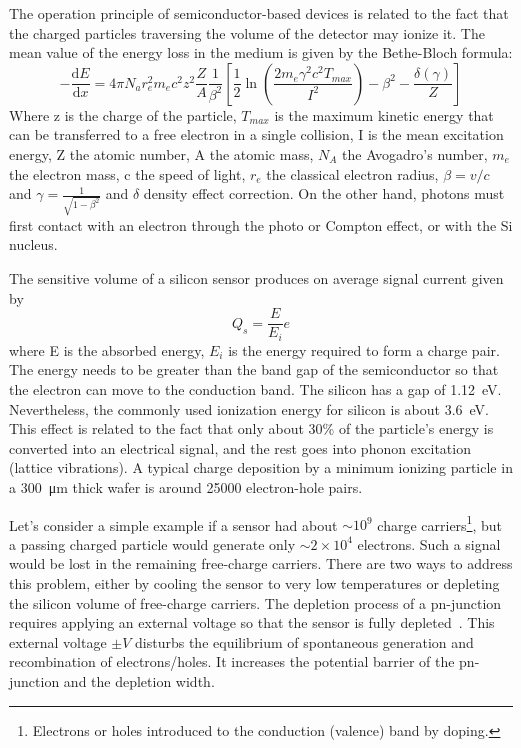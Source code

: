 The operation principle of semiconductor-based devices is related to the fact that the charged particles traversing the volume of the detector may ionize it. The mean value of the energy loss in the medium is given by the Bethe-Bloch formula:
\begin{equation}
-\dfrac{\mathrm dE}{\mathrm dx} = 4 \pi N_{a} r_{e}^{2} m_{e} c^{2} z^{2}  \dfrac{Z}{A} \frac{1}{\beta^{2}} \left[ \frac{1}{2}\ln(\frac{2m_{e}\gamma^{2}c^{2} T_{max}}{I^{2}}) - \beta^{2} -  \frac{\delta(\gamma)}{Z}\right]
\end{equation}
Where z is the charge of the particle, $T_{max}$ is the maximum kinetic energy that can be transferred to a free electron in a single collision, I is the mean excitation energy, Z the atomic number, A the atomic mass, $N_{A}$ the Avogadro’s number, $m_{e}$ the electron mass, c the speed of light, $r_{e}$ the classical electron radius, $\beta = v/c$ and $\gamma = \frac{1}{\sqrt{1-\beta^{2}}}$ and $\delta$ density effect correction. On the other hand, photons must first contact with an electron through the photo or Compton effect, or with the Si nucleus. 

The sensitive volume of a silicon sensor produces on average signal current given by 
\begin{equation}
    Q_{s} = \frac{E}{E_{i}}e
\end{equation}
where E is the absorbed energy, $E_{i}$ is the energy required to form a charge pair. The energy needs to be greater than the band gap of the semiconductor so that the electron can move to the conduction band. The silicon has a gap of \SI{1.12}{\eV}. Nevertheless, the commonly used ionization energy for silicon is about \SI{3.6}{\eV}. This effect is related to the fact that only about 30\% of the particle's energy is converted into an electrical signal, and the rest goes into phonon excitation (lattice vibrations). A typical charge deposition by a minimum ionizing particle in a \SI{300}{\micro\metre} thick wafer is around 25000 electron-hole pairs.

Let's consider a simple example if a sensor had about $\sim10^{9}$ charge carriers\footnote{Electrons or holes introduced to the conduction (valence) band by doping.}, but a passing charged particle would generate only $\sim2\times10^{4}$ electrons. Such a signal would be lost in the remaining free-charge carriers. There are two ways to address this problem, either by cooling the sensor to very low temperatures or depleting the silicon volume of free-charge carriers. The depletion process of a pn-junction requires applying an external voltage so that the sensor is fully depleted~\cite{Spieler}. This external voltage $\pm V$ disturbs the equilibrium of spontaneous generation and recombination of electrons/holes. It increases the potential barrier of the pn-junction and the depletion width. 

